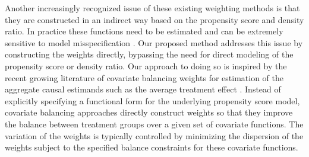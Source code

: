 \documentclass[12pt]{article}
\begin{document}
Another increasingly recognized issue of these existing weighting methods is that they are constructed in an indirect way based on the propensity score and density ratio. In practice these functions need to be estimated and can be extremely sensitive to model misspecification \citep{kang2007demystifying}. Our proposed method addresses this issue by constructing the weights directly,  bypassing the need for direct modeling of the propensity score or density ratio. Our approach to doing so is inspired by the recent growing literature of covariate balancing weights for estimation of the aggregate causal estimands such as the average treatment effect \citep{hainmueller2012entropy,imai2014covariate,wong2018kernel,hirshberg2019minimax,huling2020energy, chattopadhyay2020balancing, kallus2020generalized,kallus2022optimal}. Instead of explicitly specifying a functional form for the underlying propensity score model, covariate balancing approaches directly construct weights so that they improve the balance between treatment groups over a given set of covariate functions. 
The variation of the weights is typically controlled by minimizing the dispersion of the weights subject to the specified balance constraints for these covariate functions. 
\end{document}
